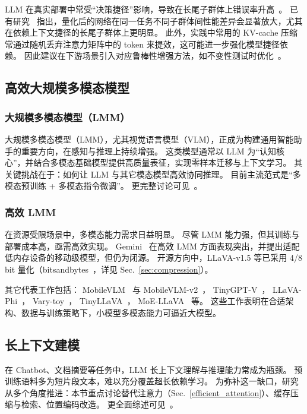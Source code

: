 LLM 在真实部署中常受“决策捷径”影响，导致在长尾子群体上错误率升高~\cite{geirhos2020shortcut}。
已有研究~\cite{yuan2023benchmarking} 指出，量化后的网络在同一任务不同子群体间性能差异会显著放大，尤其在依赖上下文捷径的长尾子群体上更明显。
此外，实践中常用的 KV-cache 压缩常通过随机丢弃注意力矩阵中的 token 来提效，这可能进一步强化模型捷径依赖。
因此建议在下游场景引入对应鲁棒性增强方法，如不变性测试时优化~\cite{ma2024invariant}。

\subsection{高效大规模多模态模型}

\subsubsection{大规模多模态模型（LMM）}

大规模多模态模型（LMM），尤其视觉语言模型（VLM），正成为构建通用智能助手的重要方向，在感知与推理上持续增强。
这类模型通常以 LLM 为“认知核心”，并结合多模态基础模型提供高质量表征，实现零样本迁移与上下文学习。
其关键挑战在于：如何让 LLM 与其它模态模型高效协同推理。
目前主流范式是“多模态预训练 + 多模态指令微调”。
更完整讨论可见~\citep{yin2023survey,zhang2024mm}。

\subsubsection{高效 LMM}

在资源受限场景中，多模态能力需求日益明显。
尽管 LMM 能力强，但其训练与部署成本高，亟需高效实现。
Gemini~\citep{team2023gemini} 在高效 LMM 方面表现突出，并提出适配低内存设备的移动级模型，但仍为闭源。
开源方向中，LLaVA-v1.5 等已采用 4/8 bit 量化（bitsandbytes~\citep{dettmers2022llm}，详见 Sec.~\ref{sec:compression}）。

其它代表工作包括：
MobileVLM~\citep{chu2023mobilevlm} 与 MobileVLM-v2~\citep{chu2024mobilevlm}，
TinyGPT-V~\citep{yuan2023tinygpt}，
LLaVA-Phi~\citep{zhu2024llava}，
Vary-toy~\citep{wei2024small}，
TinyLLaVA~\citep{zhou2024tinyllava}，
MoE-LLaVA~\citep{lin2024moe} 等。
这些工作表明在合适架构、数据与训练策略下，小模型多模态能力可逼近大模型。

\subsection{长上下文建模}

在 Chatbot、文档摘要等任务中，LLM 长上下文理解与推理能力常成为瓶颈。
预训练语料多为短片段文本，难以充分覆盖超长依赖学习。
为弥补这一缺口，研究从多个角度推进：本节重点讨论替代注意力（Sec.~\ref{efficient_attention}）、缓存压缩与检索、位置编码改造。
更全面综述可见~\cite{huang2023advancing}。

